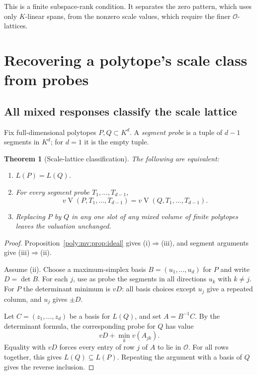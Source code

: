 \documentclass[11pt,a4paper]{article}
\numberwithin{equation}{section}
\newtheorem{theorem}{Theorem}[section]
\theoremstyle{plain}
\newcommand{\OO}{\mathcal O}
\newcommand{\MV}{\operatorname{V}}
\begin{document}
This is a finite subspace-rank condition. It separates the zero pattern,
which uses only $K$-linear spans, from the nonzero scale values, which
require the finer $\OO$-lattices.

\section{Recovering a polytope's scale class from probes}
\label{poly:mv:sec:probes}

\subsection{All mixed responses classify the scale lattice}
Fix full-dimensional polytopes $P,Q\subset K^d$. A \emph{segment probe}
is a tuple of $d-1$ segments in $K^d$; for $d=1$ it is the empty tuple.

\begin{theorem}[Scale-lattice classification]
\label{poly:mv:thm:probe-classification}
The following are equivalent:
\begin{enumerate}[label=\textup{(\roman*)}]
\item $L(P)=L(Q)$.
\item For every segment probe $T_1,\ldots,T_{d-1}$,
\[
 v\MV(P,T_1,\ldots,T_{d-1})
  =v\MV(Q,T_1,\ldots,T_{d-1}).
\]
\item Replacing $P$ by $Q$ in any one slot of any mixed volume of finite
polytopes leaves the valuation unchanged.
\end{enumerate}
\end{theorem}
\begin{proof}
Proposition~\ref{poly:mv:prop:ideal} gives (i)$\Rightarrow$(iii), and segment
arguments give (iii)$\Rightarrow$(ii).

Assume (ii). Choose a maximum-simplex basis
$B=(u_1,\ldots,u_d)$ for $P$ and write $D=\det B$. For each $j$, use
as probe the segments in all directions $u_k$ with $k\ne j$.
For $P$ the determinant minimum is $vD$: all basis choices except $u_j$
give a repeated column, and $u_j$ gives $\pm D$.

Let $C=(z_1,\ldots,z_d)$ be a basis for $L(Q)$, and set $A=B^{-1}C$.
By the determinant formula, the corresponding probe for $Q$ has value
\[
 vD+\min_k v(A_{jk}).
\]
Equality with $vD$ forces every entry of row $j$ of $A$ to lie in $\OO$.
For all rows together, this gives $L(Q)\subseteq L(P)$. Repeating the
argument with a basis of $Q$ gives the reverse inclusion.
\end{proof}
\end{document}
